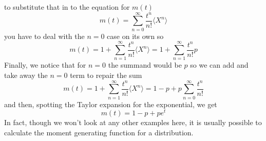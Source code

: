 \documentclass[11pt,a4paper]{scrartcl}
\begin{document}
to substitute that in to the equation for $m(t)$
\begin{equation}
m(t)=\sum_{n=0}^\infty \frac{t^n}{n!}\langle X^n\rangle
\end{equation}
you have to deal with the $n=0$ case on its own so
\begin{equation}
m(t)=1+\sum_{n=1}^\infty \frac{t^n}{n!}\langle X^n\rangle=1+\sum_{n=1}^\infty \frac{t^n}{n!}p
\end{equation}
Finally, we notice that for $n=0$ the summand would be $p$ so we can add and take away the $n=0$ term to repair the sum
\begin{equation}
m(t)=1+\sum_{n=1}^\infty \frac{t^n}{n!}\langle X^n\rangle=1-p+p\sum_{n=0}^\infty \frac{t^n}{n!}
\end{equation}
and then, spotting the Taylor expansion for the exponential, we get
\begin{equation}
m(t)=1-p+pe^{t}
\end{equation}
In fact, though we won't look at any other examples here, it is
usually possible to calculate the moment generating function for a
distribution.
\end{document}
